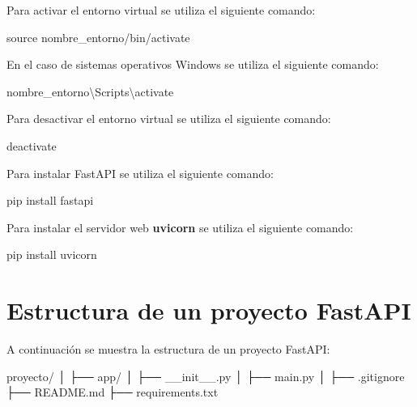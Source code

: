 \documentclass[
  a4paper,
  DIV=11,
  numbers=noendperiod,
  onepage,
  openany]{scrreprt}
\newenvironment{Shaded}{\begin{snugshade}}{\end{snugshade}}
\newcommand{\BuiltInTok}[1]{\textcolor[rgb]{0.00,0.23,0.31}{#1}}
\newcommand{\ExtensionTok}[1]{\textcolor[rgb]{0.00,0.23,0.31}{#1}}
\newcommand{\NormalTok}[1]{\textcolor[rgb]{0.00,0.23,0.31}{#1}}
\begin{document}
Para activar el entorno virtual se utiliza el siguiente comando:

\begin{Shaded}
\begin{Highlighting}[]
\BuiltInTok{source}\NormalTok{ nombre\_entorno/bin/activate}
\end{Highlighting}
\end{Shaded}

En el caso de sistemas operativos Windows se utiliza el siguiente
comando:

\begin{Shaded}
\begin{Highlighting}[]
\ExtensionTok{nombre\_entorno\textbackslash{}Scripts\textbackslash{}activate}
\end{Highlighting}
\end{Shaded}

Para desactivar el entorno virtual se utiliza el siguiente comando:

\begin{Shaded}
\begin{Highlighting}[]
\ExtensionTok{deactivate}
\end{Highlighting}
\end{Shaded}

Para instalar FastAPI se utiliza el siguiente comando:

\begin{Shaded}
\begin{Highlighting}[]
\ExtensionTok{pip}\NormalTok{ install fastapi}
\end{Highlighting}
\end{Shaded}

Para instalar el servidor web \textbf{uvicorn} se utiliza el siguiente
comando:

\begin{Shaded}
\begin{Highlighting}[]
\ExtensionTok{pip}\NormalTok{ install uvicorn}
\end{Highlighting}
\end{Shaded}

\section{Estructura de un proyecto
FastAPI}\label{estructura-de-un-proyecto-fastapi}

A continuación se muestra la estructura de un proyecto FastAPI:

\begin{Shaded}
\begin{Highlighting}[]
\NormalTok{proyecto/}
\NormalTok{│}
\NormalTok{├── app/}
\NormalTok{│   ├── \_\_init\_\_.py}
\NormalTok{│   ├── main.py}
\NormalTok{│}
\NormalTok{├── .gitignore}
\NormalTok{├── README.md}
\NormalTok{├── requirements.txt}
\end{Highlighting}
\end{Shaded}
\end{document}
